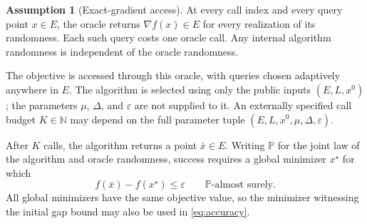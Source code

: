 \documentclass[10pt]{article}
\theoremstyle{definition}
\newtheorem{assumption}{Assumption}
\begin{document}
\begin{assumption}[Exact-gradient access]
At every call index and every query point $x\in E$, the oracle returns $\nabla f(x)\in E$ for every realization of its randomness. Each such query costs one oracle call. Any internal algorithm randomness is independent of the oracle randomness.
\end{assumption}

The objective is accessed through this oracle, with queries chosen adaptively anywhere in $E$. The algorithm is selected using only the public inputs $(E,L,x^0)$; the parameters $\mu$, $\Delta$, and $\varepsilon$ are not supplied to it. An externally specified call budget $K\in\mathbb{N}$ may depend on the full parameter tuple $(E,L,x^0,\mu,\Delta,\varepsilon)$.

After $K$ calls, the algorithm returns a point $\bar{x}\in E$. Writing $\mathbb{P}$ for the joint law of the algorithm and oracle randomness, success requires a global minimizer $x^\star$ for which
\begin{equation}
\label{eq:accuracy}
f(\bar{x})-f(x^\star)\leq\varepsilon
\qquad\mathbb{P}\text{-almost surely}.
\end{equation}
All global minimizers have the same objective value, so the minimizer witnessing the initial gap bound may also be used in \eqref{eq:accuracy}.
\end{document}
